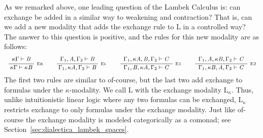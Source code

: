 \documentclass{llncs}
\newcommand{\LE}{\text{L}_\kappa}
\newcommand{\Ldrule}[4][]{{\displaystyle\frac{\begin{array}{l}#2\end{array}}{#3}\quad\Ldrulename{#4}}}
\newcommand{\Lpremise}[1]{ #1 \\}
\newcommand{\Lnt}[1]{\mathit{#1}}
\newcommand{\Lsym}[1]{#1}
\newcommand{\Ldrulename}[1]{\textsc{#1}}
\newcommand{\LdruleErName}[0]{\Ldrulename{Er}}
\newcommand{\LdruleEr}[1]{\Ldrule[#1]{%
\Lpremise{  \kappa  \Gamma   \vdash  \Lnt{B} }%
}{
  \kappa  \Gamma   \vdash   \kappa  \Lnt{B}  }{%
{\LdruleErName}{}%
}}
\newcommand{\LdruleElName}[0]{\Ldrulename{El}}
\newcommand{\LdruleEl}[1]{\Ldrule[#1]{%
\Lpremise{ \Gamma_{{\mathrm{1}}}  \Lsym{,}  \Lnt{A}  \Lsym{,}  \Gamma_{{\mathrm{2}}}  \vdash  \Lnt{B} }%
}{
 \Gamma_{{\mathrm{1}}}  \Lsym{,}   \kappa  \Lnt{A}   \Lsym{,}  \Gamma_{{\mathrm{2}}}  \vdash  \Lnt{B} }{%
{\LdruleElName}{}%
}}
\newcommand{\LdruleEOneName}[0]{\Ldrulename{E1}}
\newcommand{\LdruleEOne}[1]{\Ldrule[#1]{%
\Lpremise{ \Gamma_{{\mathrm{1}}}  \Lsym{,}   \kappa  \Lnt{A}   \Lsym{,}  \Lnt{B}  \Lsym{,}  \Gamma_{{\mathrm{2}}}  \vdash  \Lnt{C} }%
}{
 \Gamma_{{\mathrm{1}}}  \Lsym{,}  \Lnt{B}  \Lsym{,}   \kappa  \Lnt{A}   \Lsym{,}  \Gamma_{{\mathrm{2}}}  \vdash  \Lnt{C} }{%
{\LdruleEOneName}{}%
}}
\newcommand{\LdruleETwoName}[0]{\Ldrulename{E2}}
\newcommand{\LdruleETwo}[1]{\Ldrule[#1]{%
\Lpremise{ \Gamma_{{\mathrm{1}}}  \Lsym{,}  \Lnt{A}  \Lsym{,}   \kappa  \Lnt{B}   \Lsym{,}  \Gamma_{{\mathrm{2}}}  \vdash  \Lnt{C} }%
}{
 \Gamma_{{\mathrm{1}}}  \Lsym{,}   \kappa  \Lnt{B}   \Lsym{,}  \Lnt{A}  \Lsym{,}  \Gamma_{{\mathrm{2}}}  \vdash  \Lnt{C} }{%
{\LdruleETwoName}{}%
}}
\renewcommand{\Ldrule}[4][]{{\displaystyle\frac{\begin{array}{l}#2\end{array}}{#3}\,\,\Ldrulename{{\scriptsize #4}}}}
\begin{document}
As we remarked above, one leading question of the Lambek Calculus is:
can exchange be added in a similar way to weakening and contraction?
That is, can we add a new modality that adds the exchange rule to L in
a controlled way?  The answer to this question is positive, and the
rules for this new modality are as follows:
\[
\small
\begin{array}{ccccccccccccccccccccc}  
  \LdruleEr{} & & \LdruleEl{} & & \LdruleEOne{} & & \LdruleETwo{} 
\end{array}
\]
The first two rules are similar to of-course, but the last two add
exchange to formulas under the $\kappa$-modality.  We call L with the
exchange modality $\LE$.  Thus, unlike intuitionistic linear logic
where any two formulas can be exchanged, $\LE$ restricts exchange to
only formulas under the exchange modality.  Just like of-course
the exchange modality is modeled categorically as a comonad; see
Section~\ref{sec:dialectica_lambek_spaces}.

\end{document}
